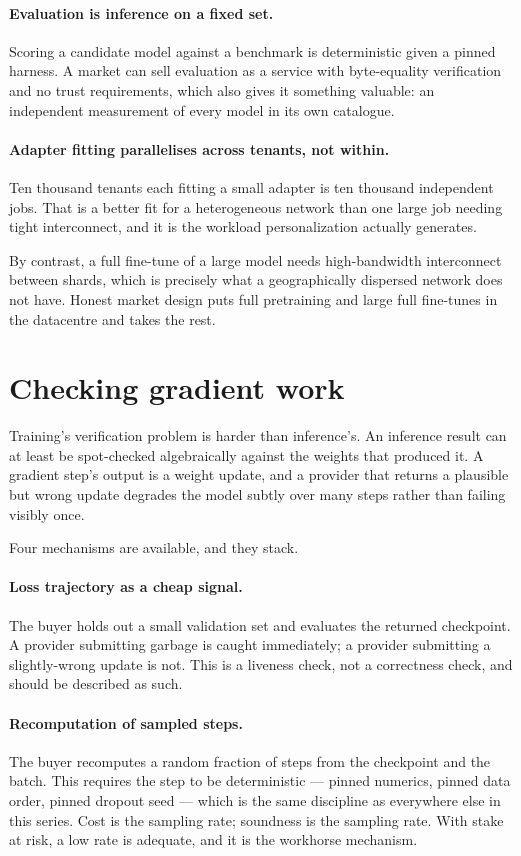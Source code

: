 \documentclass[11pt,a4paper]{article}
\begin{document}
\paragraph{Evaluation is inference on a fixed set.} Scoring a candidate model
against a benchmark is deterministic given a pinned harness. A market can sell
evaluation as a service with byte-equality verification and no trust
requirements, which also gives it something valuable: an independent measurement
of every model in its own catalogue.

\paragraph{Adapter fitting parallelises across tenants, not within.} Ten thousand
tenants each fitting a small adapter is ten thousand independent jobs. That is a
better fit for a heterogeneous network than one large job needing tight
interconnect, and it is the workload personalization actually generates.

By contrast, a full fine-tune of a large model needs high-bandwidth interconnect
between shards, which is precisely what a geographically dispersed network does
not have. Honest market design puts full pretraining and large full fine-tunes in
the datacentre and takes the rest.

\section{Checking gradient work}

Training's verification problem is harder than inference's. An inference result
can at least be spot-checked algebraically against the weights that produced it.
A gradient step's output is a weight update, and a provider that returns a
plausible but wrong update degrades the model subtly over many steps rather than
failing visibly once.

Four mechanisms are available, and they stack.

\paragraph{Loss trajectory as a cheap signal.} The buyer holds out a small
validation set and evaluates the returned checkpoint. A provider submitting
garbage is caught immediately; a provider submitting a slightly-wrong update is
not. This is a liveness check, not a correctness check, and should be described as
such.

\paragraph{Recomputation of sampled steps.} The buyer recomputes a random fraction
of steps from the checkpoint and the batch. This requires the step to be
deterministic --- pinned numerics, pinned data order, pinned dropout seed ---
which is the same discipline as everywhere else in this series. Cost is the
sampling rate; soundness is the sampling rate. With stake at risk, a low rate is
adequate, and it is the workhorse mechanism.
\end{document}
